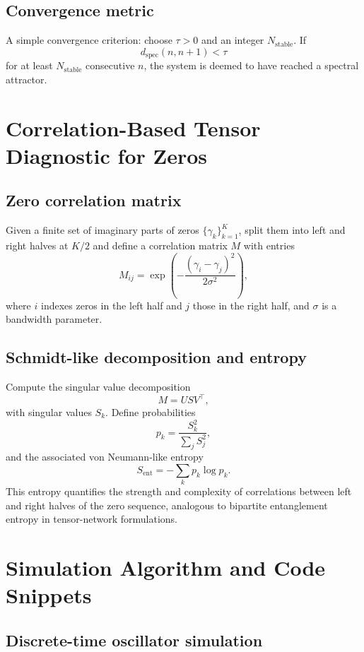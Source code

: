 \documentclass[11pt]{article}
\begin{document}
\subsection{Convergence metric}

A simple convergence criterion: choose $\tau > 0$ and an integer $N_{\text{stable}}$. If
\[
d_{\text{spec}}(n,n+1) < \tau
\]
for at least $N_{\text{stable}}$ consecutive $n$, the system is deemed to have reached a spectral attractor.

\section{Correlation-Based Tensor Diagnostic for Zeros}

\subsection{Zero correlation matrix}

Given a finite set of imaginary parts of zeros $\{\gamma_k\}_{k=1}^{K}$, split them into left and right halves at $K/2$ and define a correlation matrix $M$ with entries
\[
M_{ij} = \exp\left( - \frac{(\gamma_i - \gamma_j)^2}{2\sigma^2} \right),
\]
where $i$ indexes zeros in the left half and $j$ those in the right half, and $\sigma$ is a bandwidth parameter.

\subsection{Schmidt-like decomposition and entropy}

Compute the singular value decomposition
\[
M = U S V^{\top},
\]
with singular values $S_k$. Define probabilities
\[
p_k = \frac{S_k^2}{\sum_j S_j^2},
\]
and the associated von Neumann-like entropy
\[
S_{\text{ent}} = -\sum_k p_k \log p_k.
\]
This entropy quantifies the strength and complexity of correlations between left and right halves of the zero sequence, analogous to bipartite entanglement entropy in tensor-network formulations.\cite{file2}

\section{Simulation Algorithm and Code Snippets}

\subsection{Discrete-time oscillator simulation}
\end{document}
